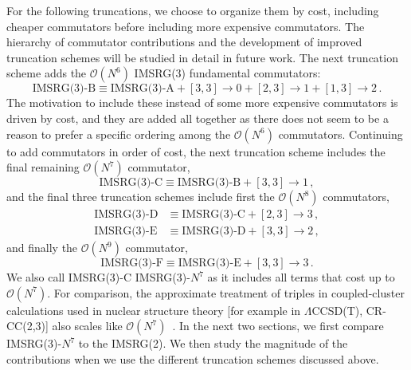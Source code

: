 For the following truncations,
we choose to organize them by cost,
including cheaper commutators before
including more expensive commutators.
The hierarchy of commutator contributions
and the development of improved truncation schemes
will be studied in detail in future work.
The next truncation scheme adds
the $\mathcal{O}(N^6)$ IMSRG(3) fundamental commutators:
\begin{equation}
    \text{IMSRG(3)-B} \equiv \text{IMSRG(3)-A}
    + [3, 3] \rightarrow 0
    + [2, 3] \rightarrow 1
    + [1, 3] \rightarrow 2\,.
\end{equation}
The motivation to include these instead of some more expensive commutators
is driven by cost,
and they are added all together as there does not seem to be a reason
to prefer a specific ordering among the $\mathcal{O}(N^6)$ commutators.
Continuing to add commutators in order of cost,
the next truncation scheme includes
the final remaining $\mathcal{O}(N^7)$ commutator,
\begin{equation}
    \text{IMSRG(3)-C} \equiv \text{IMSRG(3)-B}
    + [3, 3] \rightarrow 1\,,
\end{equation}
and the final three truncation schemes
include first
the $\mathcal{O}(N^8)$ commutators,
\begin{align}
    \text{IMSRG(3)-D} & \equiv \text{IMSRG(3)-C}
    + [2, 3] \rightarrow 3\,,                    \\
    \text{IMSRG(3)-E} & \equiv \text{IMSRG(3)-D}
    + [3, 3] \rightarrow 2\,,
\end{align}
and finally the $\mathcal{O}(N^9)$ commutator,
\begin{equation}
    \text{IMSRG(3)-F} \equiv \text{IMSRG(3)-E}
    + [3, 3] \rightarrow 3\,.
\end{equation}
We also call IMSRG(3)-C IMSRG(3)-$N^7$
as it includes all terms that cost up to
$\mathcal{O}(N^7)$.
For comparison,
the approximate treatment of triples in coupled-cluster
calculations used in nuclear structure theory
    [for example in $\Lambda$CCSD(T), CR-CC(2,3)]
also scales like
$\mathcal{O}(N^7)$~\cite{Taub08lamccsdt_1,Taub08lamccsdt_2,Bind13crcc}.
In the next two sections,
we first compare IMSRG(3)-$N^7$
to the IMSRG(2).
We then study the magnitude of the contributions
when we use the different truncation schemes discussed above.

